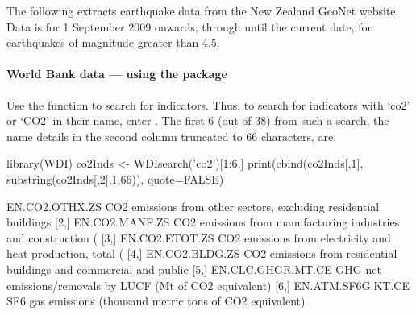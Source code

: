   The following
extracts earthquake data from the New Zealand GeoNet
website.  Data is for 1 September 2009 onwards, through until the
current date, for earthquakes of magnitude greater than 4.5.
\begin{Schunk}
\end{Schunk}

\paragraph{World Bank data --- using the  package}

Use the function  to search for indicators. Thus,
to search for indicators with `co2' or `CO2' in their name, enter
.  The first 6 (out of 38) from
such a search, the name details in the second column truncated
to 66 characters, are:
\begin{fullwidth}

\begin{Schunk}
\begin{Sinput}
library(WDI)
co2Inds <- WDIsearch('co2')[1:6,]
print(cbind(co2Inds[,1], substring(co2Inds[,2],1,66)),
      quote=FALSE)
\end{Sinput}
\begin{Soutput}
     [,1]              [,2]                                                              
[1,] EN.CO2.OTHX.ZS    CO2 emissions from other sectors, excluding residential buildings 
[2,] EN.CO2.MANF.ZS    CO2 emissions from manufacturing industries and construction (% of
[3,] EN.CO2.ETOT.ZS    CO2 emissions from electricity and heat production, total (% of to
[4,] EN.CO2.BLDG.ZS    CO2 emissions from residential buildings and commercial and public
[5,] EN.CLC.GHGR.MT.CE GHG net emissions/removals by LUCF (Mt of CO2 equivalent)         
[6,] EN.ATM.SF6G.KT.CE SF6 gas emissions (thousand metric tons of CO2 equivalent)        
\end{Soutput}
\end{Schunk}

\end{fullwidth}

